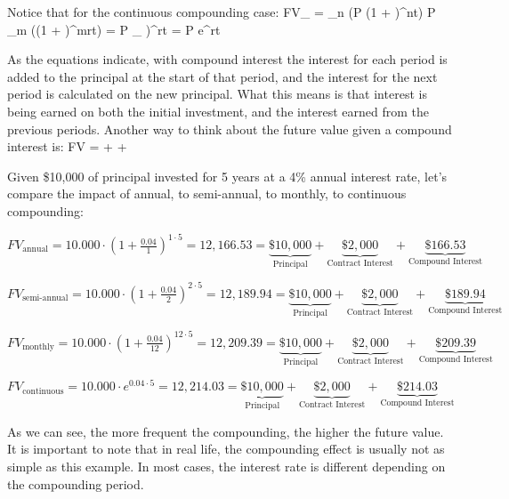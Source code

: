 Notice that for the continuous compounding case:
\bse
FV_{} = \lim_{n \to \infty} \left(P \cdot (1 + )^{nt}\right)
 P \cdot \lim_{m \to \infty} \left((1 + )^{mrt}\right)
= P \cdot {}_{} \biggl)^{rt} = P \cdot e^{rt}
\ese

As the equations indicate, with compound interest the interest for each period is added to the principal at the start
of that period, and the interest for the next period is calculated on the new principal. What this means is that
interest is being earned on both the initial investment, and the interest earned from the previous periods. Another
way to think about the future value given a compound interest is:
\bse
FV =  +  + 
\ese

\be
Given \$10,000 of principal invested for 5 years at a 4\% annual interest rate, let's compare the impact of annual, to
semi-annual, to monthly, to continuous compounding:
\bit
\item $FV_{\text{annual}} = 10.000 \cdot \left(1 + \frac{0.04}{1}\right)^{1 \cdot 5} = 12,166.53 = \underbrace{\$10,000}_{\text{Principal}} + \underbrace{\$2,000}_{\text{Contract Interest}} + \underbrace{\$166.53}_{\text{Compound Interest}}$
\item $FV_{\text{semi-annual}} = 10.000 \cdot \left(1 + \frac{0.04}{2}\right)^{2 \cdot 5} = 12,189.94 = \underbrace{\$10,000}_{\text{Principal}} + \underbrace{\$2,000}_{\text{Contract Interest}} + \underbrace{\$189.94}_{\text{Compound Interest}}$
\item $FV_{\text{monthly}} = 10.000 \cdot \left(1 + \frac{0.04}{12}\right)^{12 \cdot 5} = 12,209.39 = \underbrace{\$10,000}_{\text{Principal}} + \underbrace{\$2,000}_{\text{Contract Interest}} + \underbrace{\$209.39}_{\text{Compound Interest}}$
\item $FV_{\text{continuous}} = 10.000 \cdot e^{0.04 \cdot 5} = 12,214.03 = \underbrace{\$10,000}_{\text{Principal}} + \underbrace{\$2,000}_{\text{Contract Interest}} + \underbrace{\$214.03}_{\text{Compound Interest}}$
\eit

As we can see, the more frequent the compounding, the higher the future value. It is important to note that in real
life, the compounding effect is usually not as simple as this example. In most cases, the interest rate is different
depending on the compounding period.
\ee

